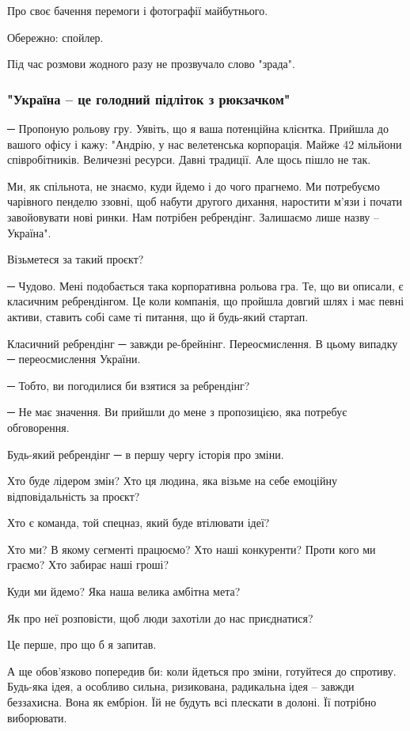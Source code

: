 Про своє бачення перемоги і фотографії майбутнього.

Обережно: спойлер. 

Під час розмови жодного разу не прозвучало слово "зрада". 

\subsubsection{"Україна – це голодний підліток з рюкзачком"}

─ Пропоную рольову гру. Уявіть, що я ваша потенційна клієнтка. Прийшла до
вашого офісу і кажу: "Андрію, у нас велетенська корпорація. Майже 42 мільйони
співробітників. Величезні ресурси. Давні традиції. Але щось пішло не так.

Ми, як спільнота, не знаємо, куди йдемо і до чого прагнемо. Ми потребуємо
чарівного пенделю ззовні, щоб набути другого дихання, наростити м’язи і почати
завойовувати нові ринки. Нам потрібен ребрендінг. Залишаємо лише назву –
Україна".

Візьметеся за такий проєкт?

─ Чудово. Мені подобається така корпоративна рольова гра. Те, що ви описали, є
класичним ребрендінгом. Це коли компанія, що пройшла довгий шлях і має певні
активи, ставить собі саме ті питання, що й будь-який стартап.

Класичний ребрендінг ─ завжди ре-брейнінг. Переосмислення. В цьому випадку ─
переосмислення України.

─ Тобто, ви погодилися би взятися за ребрендінг?

─ Не має значення. Ви прийшли до мене з пропозицією, яка потребує обговорення.

Будь-який ребрендінг ─ в першу чергу історія про зміни.

Хто буде лідером змін? Хто ця людина, яка візьме на себе емоційну
відповідальність за проєкт?

Хто є команда, той спецназ, який буде втілювати ідеї?

Хто ми? В якому сегменті працюємо? Хто наші конкуренти? Проти кого ми граємо?
Хто забирає наші гроші?

Куди ми йдемо? Яка наша велика амбітна мета?

Як про неї розповісти, щоб люди захотіли до нас приєднатися?

Це перше, про що б я запитав.

А ще обов’язково попередив би: коли йдеться про зміни, готуйтеся до спротиву.
Будь-яка ідея, а особливо сильна, ризикована, радикальна ідея – завжди
беззахисна. Вона як ембріон. Їй не будуть всі плескати в долоні. Її потрібно
виборювати.

